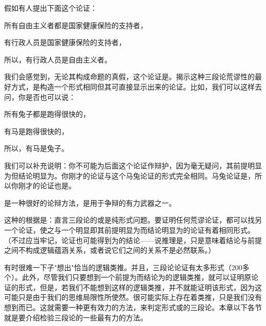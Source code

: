 \begin{examplebox}[title=逻辑类推法的应用]
假如有人提出下面这个论证：

所有自由主义者都是国家健康保险的支持者，

有行政人员是国家健康保险的支持者，

所以，有行政人员是自由主义者。

我们会感觉到，无论其构成命题的真假，这个论证是。揭示这种三段论荒谬性的最好方式，是构造一个形式相同但其可直接显示出来的论证。比如，我们可以这样去问，你是否也可以说：

所有兔子都是跑得很快的，

有马是跑得很快的，

所以，有马是兔子。

我们可以补充说明：你不可能为后面这个论证作辩护，因为毫无疑问，其前提明显为但结论明显为。你刚才的论证与这个马兔论证的形式完全相同。马兔论证是，所以你刚才的论证也是。
\end{examplebox}

是一种很好的论辩方法，是用于争辩的有力武器之一。

这种的根据是：直言三段论的或是纯形式问题。要证明任何荒谬论证，都可以找另一个论证，使之与一个明显即其前提明显为而结论明显为的论证有着相同形式。（不过应当牢记，论证也可能得到为的结论——说推理是，只是意味着结论与前提之间不构成逻辑蕴涵关系，或者说它们之间的关系不是必然联系。）

有时很难一下子"想出"恰当的逻辑类推。并且，三段论论证有太多形式（200多个）。此外，尽管我们只要想到一个前提为而结论为的逻辑类推，就可以证明原论证的形式，但是，若我们不能想到这样的逻辑类推，并不就能证明该形式，因为这可能只是由于我们的思维局限性所使然。很可能实际上存在着类推，只是我们没有想到而已。这就需要一种更有效力的方法，来判定形式或的三段论。本章以下各节就是要介绍检验三段论的一些最有力的方法。


